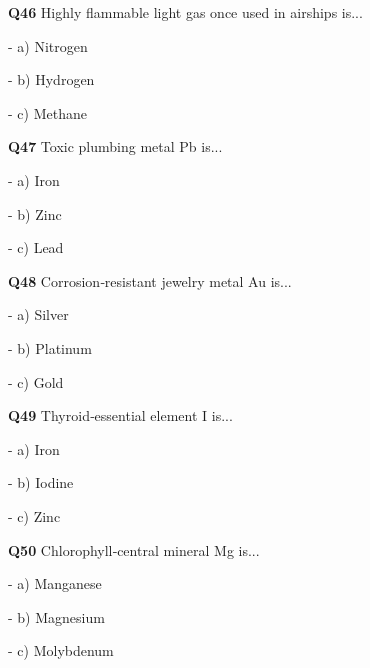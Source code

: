 \textbf{Q46} Highly flammable light gas once used in airships is...\par
\quad - a) Nitrogen\par
\quad - b) Hydrogen\par
\quad - c) Methane\par

\textbf{Q47} Toxic plumbing metal Pb is...\par
\quad - a) Iron\par
\quad - b) Zinc\par
\quad - c) Lead\par

\textbf{Q48} Corrosion‑resistant jewelry metal Au is...\par
\quad - a) Silver\par
\quad - b) Platinum\par
\quad - c) Gold\par

\textbf{Q49} Thyroid‑essential element I is...\par
\quad - a) Iron\par
\quad - b) Iodine\par
\quad - c) Zinc\par

\textbf{Q50} Chlorophyll‑central mineral Mg is...\par
\quad - a) Manganese\par
\quad - b) Magnesium\par
\quad - c) Molybdenum\par